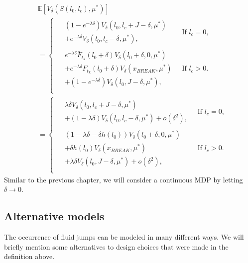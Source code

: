 \begin{equation}\label{eq:SimpleFluidNextState}
\begin{split}
&\mathbb{E}[V_\delta(S(l_0,l_c),\mu^*)]\\
&=\begin{cases}
\begin{split}
&(1-e^{-\lambda \delta})V_\delta(l_0,l_c+J-\delta,\mu^*)\\
&+e^{-\lambda \delta}V_\delta(l_0,l_c-\delta,\mu^*),
\end{split}&\ \text{If $l_c=0$,}\\
\begin{split}
&e^{-\lambda \delta} \bar{F}_{t_k}(l_0+\delta)V_\delta(l_0+\delta,0,\mu^*)\\
&+ e^{-\lambda \delta}F_{t_k}(l_0+\delta)V_\delta(x_{BREAK},\mu^*)\\
&+(1-e^{-\lambda \delta})V_\delta(l_0,J-\delta,\mu^*),
\end{split}&\ \text{If $l_c>0$.}\\
\end{cases}\\
&=\begin{cases}
\begin{split}
&\lambda\delta V_\delta(l_0,l_c+J-\delta,\mu^*)\\
&+(1-\lambda \delta)V_\delta(l_0,l_c-\delta,\mu^*)+o(\delta^2),
\end{split}
&\ \text{If $l_c=0$,}\\
\begin{split}
&(1-\lambda \delta-\delta h(l_0))V_\delta(l_0+\delta,0,\mu^*)\\
&+ \delta h(l_0)V_\delta(x_{BREAK},\mu^*)\\
&+\lambda \delta V_\delta(l_0,J-\delta,\mu^*)+o(\delta^2),
\end{split}&\ \text{If $l_c>0$.}\\
\end{cases}
\end{split}
\end{equation}
Similar to the previous chapter, we will consider a continuous MDP by letting $\delta\rightarrow0$.

\subsection{Alternative models}
The occurrence of fluid jumps can be modeled in many different ways.
We will briefly mention some alternatives to design choices that were made in the definition above.
